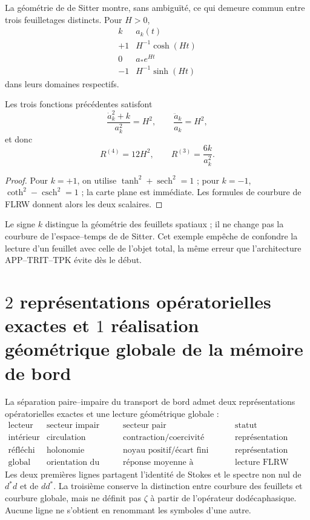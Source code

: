 La géométrie de de Sitter montre, sans ambiguïté, ce qui demeure commun entre
trois feuilletages distincts. Pour \(H>0\),
\[
\begin{array}{c|c}
k&a_k(t)\\ \hline
+1&H^{-1}\cosh(Ht)\\
0&a_\ast e^{Ht}\\
-1&H^{-1}\sinh(Ht)
\end{array}
\]
dans leurs domaines respectifs.

\begin{proposition}
\label{prop:tres-foliaciones-rev6}
Les trois fonctions précédentes satisfont
\[
 \frac{\dot a_k^2+k}{a_k^2}=H^2,\qquad
 \frac{\ddot a_k}{a_k}=H^2,
\]
et donc
\[
 \boxed{\quad
 R^{(4)}=12H^2,\qquad
 R^{(3)}=\frac{6k}{a_k^2}.
 \quad}
\]
\end{proposition}

\begin{proof}
Pour \(k=+1\), on utilise
\(\tanh^2+\operatorname{sech}^2=1\) ; pour \(k=-1\),
\(\coth^2-\operatorname{csch}^2=1\) ; la carte plane est immédiate.
Les formules de courbure de FLRW donnent alors les deux scalaires.
\end{proof}

Le signe \(k\) distingue la géométrie des feuillets spatiaux ; il ne change pas la
courbure de l'espace--temps de de Sitter. Cet exemple empêche de confondre
la lecture d'un feuillet avec celle de l'objet total, la même erreur que
l'architecture APP--TRIT--TPK évite dès le début.

\section{\(2\) représentations opératorielles exactes et \(1\) réalisation géométrique globale de la mémoire de bord}

\begin{theorem}
\label{thm:una-memoria-tres-funciones}
La séparation paire--impaire du transport de bord admet deux
représentations opératorielles exactes et une lecture géométrique globale :
\[
\begin{array}{c|c|c|c}
\text{lecteur}&\text{secteur impair}&\text{secteur pair}&\text{statut}\\ \hline
\text{intérieur}&\text{circulation}&\text{contraction/coercivité}
&\text{représentation exacte}\\
\text{réfléchi}&\text{holonomie}&\text{noyau positif/écart fini}
&\text{représentation exacte}\\
\text{global}&\text{orientation du feuillet}&
                \text{réponse moyenne à l'expansion}
&\text{lecture FLRW typée}
\end{array}
\]
Les deux premières lignes partagent l'identité de Stokes et le spectre non
nul de \(d^\ast d\) et de \(dd^\ast\). La troisième conserve la distinction entre
courbure des feuillets et courbure globale, mais ne définit pas \(\zeta\) à partir de
l'opérateur dodécaphasique. Aucune ligne ne s'obtient en renommant les symboles d'une
autre.
\end{theorem}

